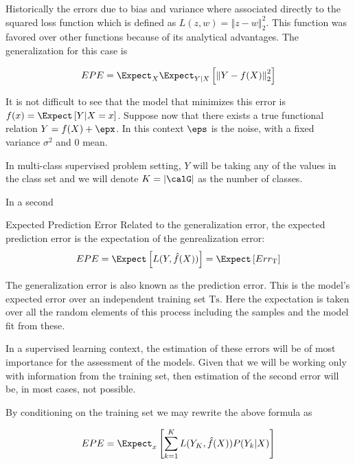 Historically the errors due to bias and variance where associated directly to the squared loss function which is defined as $L(z,w) = \left\Vert z-w \right\Vert^2_2$. This function was favored over other functions because of its analytical advantages.  The generalization for this case is

\begin{equation}\label{classificationEPE}
	 EPE = \Expect_X \Expect_{Y|X} \left[ \left\Vert  Y - f(X)  \right\Vert_2^2 \right]
\end{equation}

It is not difficult to see that the model that minimizes this error is $f(x) = \Expect \left[ Y | X=x \right] $. Suppose now that there exists a true functional relation $Y = f(X) + \epx$. In this context $\eps$ is the noise, with a fixed variance $\sigma^2$ and $0$ mean. 




In multi-class supervised problem setting, $Y$ will be taking any of the values in the class set \calG and we will denote $K = |\calG|$ as the number of classes.





In a second

\begin{definition}{Expected Prediction Error}
	Related to the generalization error, the expected prediction error is the expectation of the genrealization error:
	$$ EPE = \Expect \left[ L(Y,\hat{f}(X))\right] =  \Expect \left[ Err_{\mathrm{T}}  \right]$$
\end{definition}
The generalization error is also known as the prediction error. This is the model's expected error over an independent training set $\mathrm{Ts}$. Here the expectation is taken over all the random elements of this process including the samples and the model fit from these. 

In a supervised learning context, the estimation of these errors will be of most importance for the assessment of the models.  Given  that we will be working only with information from the training set, then estimation of the second error will be, in most cases, not possible.

By conditioning on the training set we may rewrite the above formula as 

\begin{equation}\label{classificationEPE}
	 EPE = \Expect_x\left[ \sum_{k=1}^{K} L( Y_K , \hat{f}(X) ) P(Y_k|X) \right]
\end{equation}


